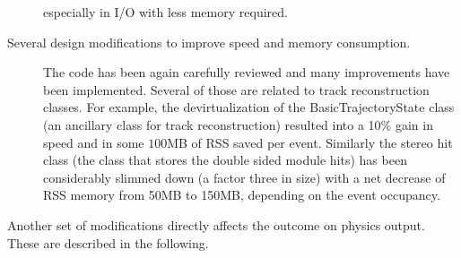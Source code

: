 \begin{description}
  especially in I/O with less memory required. 
\item[Several design modifications to improve speed and memory
  consumption.] The code has been again carefully reviewed and many
  improvements have been implemented. Several of those are related to
  track reconstruction classes. For example, the devirtualization of
  the BasicTrajectoryState class (an ancillary class for track
  reconstruction) resulted into a 10\% gain in speed and in some
  $100$MB of RSS saved per event. Similarly the stereo hit class (the
  class that stores the double sided module hits) has been
  considerably slimmed down (a factor three in size) with a net decrease of
  RSS memory from 50MB to 150MB, depending on the event occupancy.
\end{description}

Another set of modifications directly affects the outcome on physics
output. These are described in the following.
